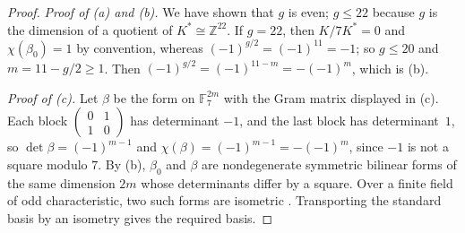\documentclass[11pt,a4paper]{article}
\theoremstyle{definition}
\theoremstyle{remark}
\newcommand{\ZZ}{\mathbb{Z}}
\newcommand{\FF}{\mathbb{F}}
\begin{document}
\begin{proof}
\emph{Proof of (a) and (b).} We have shown that $g$ is even; $g\le22$ because $g$ is the dimension of a quotient of
$K^*\cong\ZZ^{22}$. If $g=22$, then $K/7K^*=0$ and $\chi(\beta_0)=1$ by convention, whereas
$(-1)^{g/2}=(-1)^{11}=-1$; so $g\le20$ and $m=11-g/2\ge1$. Then $(-1)^{g/2}=(-1)^{11-m}=-(-1)^m$, which is (b).

\emph{Proof of (c).} Let $\beta$ be the form on $\FF_7^{2m}$ with the Gram matrix displayed in (c). Each block
$\left(\begin{smallmatrix}0&1\\1&0\end{smallmatrix}\right)$ has determinant $-1$, and the last block has
determinant~$1$, so $\det\beta=(-1)^{m-1}$ and $\chi(\beta)=(-1)^{m-1}=-(-1)^m$, since $-1$ is not a square modulo
$7$. By (b), $\beta_0$ and $\beta$ are nondegenerate symmetric bilinear forms of the same dimension $2m$ whose
determinants differ by a square. Over a finite field of odd characteristic, two such forms are isometric
\cite[Chapter~IV, \S1.7]{Se}. Transporting the standard basis by an isometry gives the required basis.
\end{proof}
\end{document}
